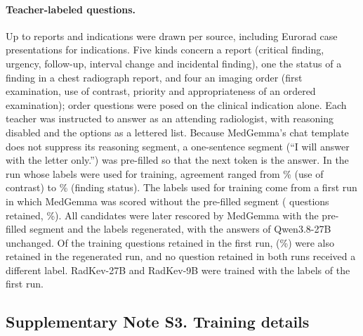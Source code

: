 \documentclass[11pt]{article}
\begin{document}
\paragraph{Teacher-labeled questions.} Up to  reports and  indications were drawn per source, including Eurorad case presentations for indications. Five kinds concern a report (critical finding, urgency, follow-up, interval change and incidental finding), one the status of a finding in a chest radiograph report, and four an imaging order (first examination, use of contrast, priority and appropriateness of an ordered examination); order questions were posed on the clinical indication alone. Each teacher was instructed to answer as an attending radiologist, with reasoning disabled and the options as a lettered list. Because MedGemma's chat template does not suppress its reasoning segment, a one-sentence segment (``I will answer with the letter only.'') was pre-filled so that the next token is the answer. In the run whose labels were used for training, agreement ranged from \% (use of contrast) to \% (finding status). The labels used for training come from a first run in which MedGemma was scored without the pre-filled segment ( questions retained, \%). All candidates were later rescored by MedGemma with the pre-filled segment and the labels regenerated, with the answers of Qwen3.8-27B unchanged. Of the  training questions retained in the first run,  (\%) were also retained in the regenerated run, and no question retained in both runs received a different label. RadKev-27B and RadKev-9B were trained with the labels of the first run.

\begin{table}[!h]
  \caption{Teacher-labeled question kinds. Candidates were answered by MedGemma-27B-text and Qwen3.8-27B; a question was retained when both ranked the same answer first. Order questions saw only the clinical indication. First run, labels used for training, model selection and the main evaluation; regenerated, labels after rescoring MedGemma with the pre-filled reasoning segment.}
  \label{tab:teacher}
  \centering\footnotesize\setlength{\tabcolsep}{3.5pt}
  
\end{table}

\FloatBarrier
\subsection*{Supplementary Note S3. Training details}
\end{document}
